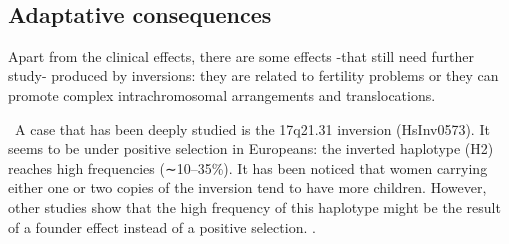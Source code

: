 \documentclass[a4paper,12pt]{article}
\begin{document}
\
\subsection{Adaptative consequences}
Apart from the clinical effects, there are some effects -that still need further study- produced by inversions: they are related to fertility problems or they can promote complex intrachromosomal arrangements and translocations. 

\
A case that has been deeply studied is the 17q21.31 inversion (HsInv0573). It seems to be under positive selection in Europeans: the inverted haplotype (H2) reaches high frequencies (∼10–35\%). It has been noticed that  women carrying either one or two copies of the inversion tend to have more children. However, other studies show that the high frequency of this haplotype might be the result of a founder effect instead of a positive selection.  \cite{puig_human_2015}.
\newpage


\end{document}
